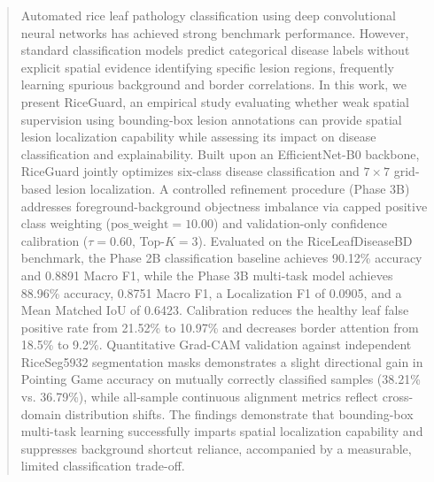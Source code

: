 \begin{abstract}
Automated rice leaf pathology classification using deep convolutional neural networks has achieved strong benchmark performance. However, standard classification models predict categorical disease labels without explicit spatial evidence identifying specific lesion regions, frequently learning spurious background and border correlations. In this work, we present RiceGuard, an empirical study evaluating whether weak spatial supervision using bounding-box lesion annotations can provide spatial lesion localization capability while assessing its impact on disease classification and explainability. Built upon an EfficientNet-B0 backbone, RiceGuard jointly optimizes six-class disease classification and $7\times 7$ grid-based lesion localization. A controlled refinement procedure (Phase 3B) addresses foreground-background objectness imbalance via capped positive class weighting ($\text{pos\_weight}=10.00$) and validation-only confidence calibration ($\tau=0.60$, Top-$K=3$). Evaluated on the RiceLeafDiseaseBD benchmark, the Phase 2B classification baseline achieves 90.12\% accuracy and 0.8891 Macro F1, while the Phase 3B multi-task model achieves 88.96\% accuracy, 0.8751 Macro F1, a Localization F1 of 0.0905, and a Mean Matched IoU of 0.6423. Calibration reduces the healthy leaf false positive rate from 21.52\% to 10.97\% and decreases border attention from 18.5\% to 9.2\%. Quantitative Grad-CAM validation against independent RiceSeg5932 segmentation masks demonstrates a slight directional gain in Pointing Game accuracy on mutually correctly classified samples (38.21\% vs. 36.79\%), while all-sample continuous alignment metrics reflect cross-domain distribution shifts. The findings demonstrate that bounding-box multi-task learning successfully imparts spatial localization capability and suppresses background shortcut reliance, accompanied by a measurable, limited classification trade-off.
\end{abstract}
